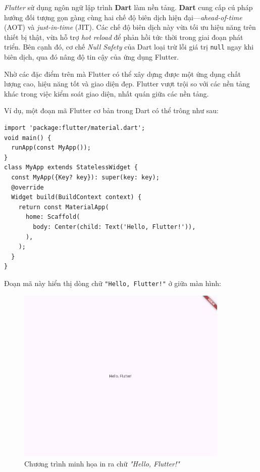 \documentclass[../DoAn.tex]{subfiles}
\numberwithin{figure}{chapter}
\begin{document}
\textit{Flutter} sử dụng ngôn ngữ lập trình \textbf{Dart} làm nền tảng. \textbf{Dart} cung cấp cú pháp hướng đối tượng gọn gàng cùng hai chế độ biên dịch hiện đại—\emph{ahead-of-time} (AOT) và \emph{just-in-time} (JIT). Các chế độ biên dịch này vừa tối ưu hiệu năng trên thiết bị thật, vừa hỗ trợ \emph{hot reload} để phản hồi tức thời trong giai đoạn phát triển. Bên cạnh đó, cơ chế \emph{Null Safety} của Dart loại trừ lỗi giá trị \texttt{null} ngay khi biên dịch, qua đó nâng độ tin cậy của ứng dụng Flutter.

Nhờ các đặc điểm trên mà Flutter có thể xây dựng được một ứng dụng chất lượng cao, hiệu năng tốt và giao diện đẹp. Flutter vượt trội so với các nền tảng khác trong việc kiểm soát giao diện, nhất quán giữa các nền tảng.

Ví dụ, một đoạn mã Flutter cơ bản trong Dart có thể trông như sau:
\begin{lstlisting}
import 'package:flutter/material.dart';
void main() {
  runApp(const MyApp());
}
class MyApp extends StatelessWidget {
  const MyApp({Key? key}): super(key: key);
  @override
  Widget build(BuildContext context) {
    return const MaterialApp(
      home: Scaffold(
        body: Center(child: Text('Hello, Flutter!')),
      ),
    );
  }
}
\end{lstlisting}

Đoạn mã này hiển thị dòng chữ \texttt{"Hello, Flutter!"} ở giữa màn hình:
\begin{figure}[H]
    \centering
    \includegraphics[width=0.9\textwidth]{Hinhve/helloflutter.png}
    \caption{Chương trình minh họa in ra chữ \textit{"Hello, Flutter!"}}
    \label{fig:flutterimg}
\end{figure}
\end{document}
